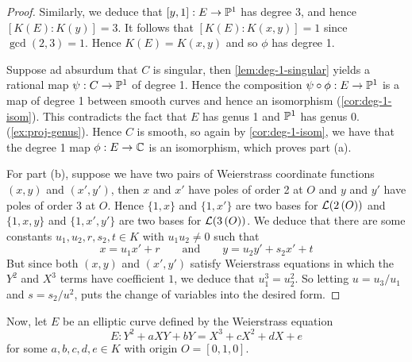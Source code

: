 \begin{proof}
	Similarly,
	we deduce that $[y, 1]: E \to \mathbb{P}^1$ 
	has degree 3, and hence $[K(E): K(y)] = 3$.
	It follows that $[K(E): K(x, y)] = 1$ since $\gcd(2, 3) = 1$.
	Hence $K(E) = K(x, y)$ and so $\phi$ has degree 1.

	Suppose ad absurdum that $C$ is singular, then \ref{lem:deg-1-singular}
	yields a rational map $\psi: C \to \mathbb{P}^1$ of degree 1. Hence
	the composition $\psi\circ\phi: E \to \mathbb{P}^1$ is a map of degree 1 between
	smooth curves and hence an isomorphism (\ref{cor:deg-1-isom}).
	This contradicts the fact that $E$ has genus 1 and $\mathbb{P}^1$ has genus 0.
	(\ref{ex:proj-genus}). Hence $C$ is smooth, so again by
	\ref{cor:deg-1-isom},
	we have that the degree 1 map $\phi: E \to \mathbb{C}$ is
	an isomorphism, which proves part (a).

	For part (b), suppose we have two pairs of Weierstrass coordinate functions
	$(x, y)$ and $(x', y')$, then $x$ and $x'$ have poles of order 2 at $O$
	and $y$ and $y'$ have poles of order 3 at $O$.
	Hence $\{1, x\}$ and $\{1, x'\}$ are two bases for $\mathcal{L}(2\,(O))$
	and $\{1, x, y\}$ and $\{1, x', y'\}$ are two bases for
	$\mathcal{L}(3\,(O))$. We deduce that there are some constants
	$u_1, u_2, r, s_2, t \in K$ with $u_1u_2 \neq 0$ such that
	\begin{equation*}
		x = u_1x' + r\qquad\textrm{and}\qquad y= u_2y' + s_2x' + t
	\end{equation*}
	But since both $(x, y)$ and $(x', y')$ satisfy Weierstrass equations in
	which the $Y^2$ and $X^3$ terms have coefficient $1$, we deduce that
	$u_1^3 = u_2^2$. So letting $u = u_3/u_1$ and $s = s_2/u^2$, puts the change
	of variables into the desired form.
\end{proof}


Now, let $E$ be an elliptic curve defined by the Weierstrass equation
\begin{equation}
	\label{weierstrass-eq}
	E: Y^2 + aXY + bY = X^3 + cX^2 + dX + e
\end{equation}
for some $a, b, c, d, e \in K$ with origin $O = [0, 1, 0]$.

